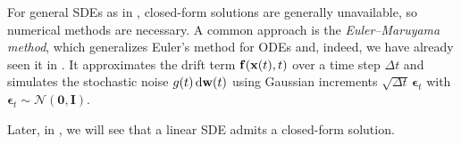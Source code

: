 For general SDEs as in , closed-form solutions are generally unavailable, so numerical methods are necessary. A common approach is the \emph{Euler–Maruyama method}, which generalizes Euler’s method for ODEs and, indeed, we have already seen it in . It approximates the drift term ${\mathbf{f}}({\mathbf{x}}(t), t)$ over a time step $\Delta t$ and simulates the stochastic noise $g(t) \mathop{}\!\mathrm{d} {\mathbf{w}}(t)$ using Gaussian increments $\sqrt{\Delta t} \, \boldsymbol{\epsilon}_t$ with $\boldsymbol{\epsilon}_t \sim \mathcal{N}(\mathbf{0}, \mathbf{I})$. 

Later, in , we will see that a linear SDE admits a closed-form solution.


